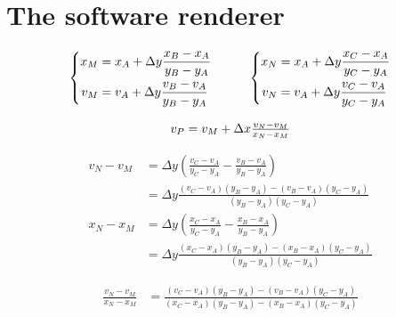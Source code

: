 \chapter{The software renderer}

\newcommand{\dy}{\Delta y}
\newcommand{\dx}{\Delta x}


\begin{displaymath}
  \begin{array}{c}
    \begin{array}{c@{\quad\quad\quad}c}
      \left\{
        \begin{aligned}
          x_M & = x_A + \dy \frac{x_B - x_A}{y_B - y_A} \\
          v_M & = v_A + \dy \frac{v_B - v_A}{y_B - y_A} 
        \end{aligned}
      \right.
      &
      \left\{
        \begin{aligned}
          x_N & = x_A + \dy \frac{x_C - x_A}{y_C - y_A} \\
          v_N & = v_A + \dy \frac{v_C - v_A}{y_C - y_A} \\
        \end{aligned}
      \right.
    \end{array}
    \\
    \\
    v_P = v_M + \dx \frac{v_N - v_M}{x_N - x_M}
  \end{array}
\end{displaymath}

\begin{align*}
v_N - v_M & = \dy (\frac{v_C - v_A}{y_C - y_A} - \frac{v_B - v_A}{y_B - y_A}) \\
& = \dy \frac{(v_C - v_A)(y_B - y_A) - (v_B - v_A)(y_C - y_A)}{(y_B - y_A)(y_C - y_A)}
\\
x_N - x_M & = \dy (\frac{x_C - x_A}{y_C - y_A} - \frac{x_B - x_A}{y_B - y_A}) \\
& = \dy \frac{(x_C - x_A)(y_B - y_A) - (x_B - x_A)(y_C - y_A)}{(y_B - y_A)(y_C - y_A)}
\end{align*}

\begin{align*}
\frac{v_N - v_M}{x_N - x_M} & = \frac{(v_C - v_A)(y_B - y_A) - (v_B - v_A)(y_C - y_A)}{(x_C - x_A)(y_B - y_A) - (x_B - x_A)(y_C - y_A)}
\end{align*}
